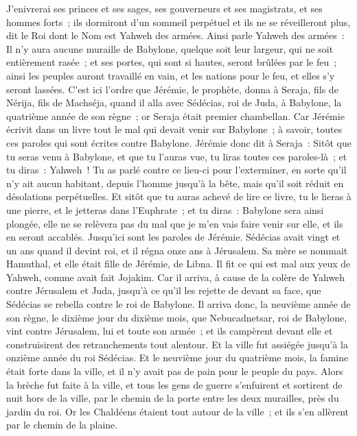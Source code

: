 \begin{multicols}{2}
J'enivrerai ses princes et ses sages, ses gouverneurs et ses magistrats, et ses hommes forts~; ils dormiront d'un sommeil perpétuel et ils ne se réveilleront plus, dit le Roi dont le Nom est Yahweh des armées.
Ainsi parle Yahweh des armées~: Il n'y aura aucune muraille de Babylone, quelque soit leur largeur, qui ne soit entièrement rasée~; et ses portes, qui sont si hautes, seront brûlées par le feu~; ainsi les peuples auront travaillé en vain, et les nations pour le feu, et elles s'y seront lassées.
C'est ici l'ordre que Jérémie, le prophète, donna à Seraja, fils de Nérija, fils de Machséja, quand il alla avec Sédécias, roi de Juda, à Babylone, la quatrième année de son règne~; or Seraja était premier chambellan.
Car Jérémie écrivit dans un livre tout le mal qui devait venir sur Babylone~; à savoir, toutes ces paroles qui sont écrites contre Babylone.
Jérémie donc dit à Seraja~: Sitôt que tu seras venu à Babylone, et que tu l'auras vue, tu liras toutes ces paroles-là~;
et tu diras~: Yahweh~! Tu as parlé contre ce lieu-ci pour l'exterminer, en sorte qu'il n'y ait aucun habitant, depuis l'homme jusqu'à la bête, mais qu'il soit réduit en désolations perpétuelles.
Et sitôt que tu auras achevé de lire ce livre, tu le lieras à une pierre, et le jetteras dans l'Euphrate~;
et tu diras~: Babylone sera ainsi plongée, elle ne se relèvera pas du mal que je m'en vais faire venir sur elle, et ils en seront accablés. Jusqu'ici sont les paroles de Jérémie.
\VerseOne{}Sédécias avait vingt et un ans quand il devint roi, et il régna onze ans à Jérusalem. Sa mère se nommait Hamuthal, et elle était fille de Jérémie, de Libna.
Il fit ce qui est mal aux yeux de Yahweh, comme avait fait Jojakim.
Car il arriva, à cause de la colère de Yahweh contre Jérusalem et Juda, jusqu'à ce qu'il les rejette de devant sa face, que Sédécias se rebella contre le roi de Babylone.
Il arriva donc, la neuvième année de son règne, le dixième jour du dixième mois, que Nebucadnetsar, roi de Babylone, vint contre Jérusalem, lui et toute son armée~; et ils campèrent devant elle et construisirent des retranchements tout alentour.
Et la ville fut assiégée jusqu'à la onzième année du roi Sédécias.
Et le neuvième jour du quatrième mois, la famine était forte dans la ville, et il n'y avait pas de pain pour le peuple du pays.
Alors la brèche fut faite à la ville, et tous les gens de guerre s'enfuirent et sortirent de nuit hors de la ville, par le chemin de la porte entre les deux murailles, près du jardin du roi. Or les Chaldéens étaient tout autour de la ville~; et ils s'en allèrent par le chemin de la plaine.

\end{multicols}

